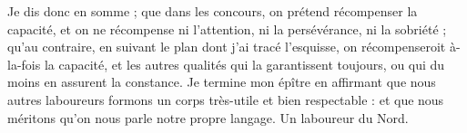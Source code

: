 Je dis donc en somme ; que dans les concours, on prétend récompenser la capacité, et on ne récompense ni l'attention, ni la persévérance, ni la sobriété ; qu'au contraire, en suivant le plan dont j'ai tracé l'esquisse, on récompenseroit à-la-fois la capacité, et les autres qualités qui la garantissent toujours, ou qui du moins en assurent la constance.
Je termine mon épître en affirmant que nous autres laboureurs formons un corps très-utile et bien respectable : et que nous méritons qu'on nous parle notre propre langage.
Un laboureur du Nord.